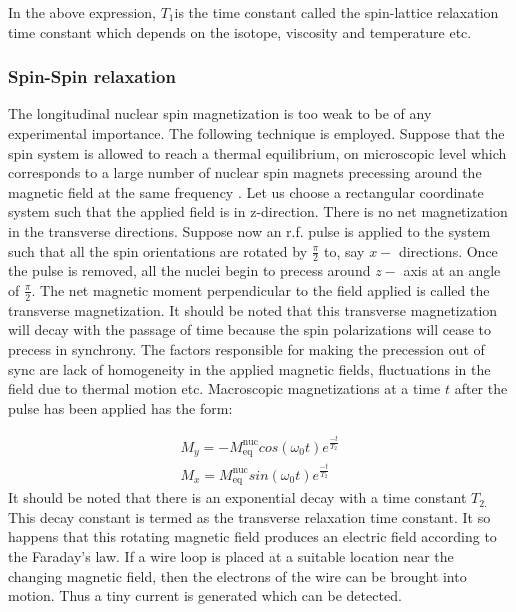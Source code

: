 		In the above expression, $T_{1}$is the time constant called the spin-lattice
		relaxation time constant which depends on the isotope, viscosity and
		temperature etc.


		\subsubsection{Spin-Spin relaxation}

		The longitudinal nuclear spin magnetization is too weak to be of any
		experimental importance. The following technique is employed. Suppose
		that the spin system is allowed to reach a thermal equilibrium, on
		microscopic level which corresponds to a large number of nuclear spin
		magnets precessing around the magnetic field at the same frequency
		. Let us choose a rectangular coordinate system such that the applied
		field is in z-direction. There is no net magnetization in the transverse
		directions. Suppose now an r.f. pulse is applied to the system such
		that all the spin orientations are rotated by $\frac{\pi}{2}$ to,
		say $x-$ directions. Once the pulse is removed, all the nuclei begin
		to precess around $z-$ axis at an angle of $\frac{\pi}{2}$. The
		net magnetic moment perpendicular to the field applied is called the
		transverse magnetization. It should be noted that this transverse
		magnetization will decay with the passage of time because the spin
		polarizations will cease to precess in synchrony. The factors responsible
		for making the precession out of sync are lack of homogeneity in
		the applied magnetic fields, fluctuations in the field due to thermal
		motion etc. Macroscopic magnetizations at a time $t$ after the pulse
		has been applied has the form:

		\begin{equation}
		\begin{array}{c}
		M_{y}=-M_\text{eq}^\text{nuc}cos(\omega_{0}t)e^{\frac{-t}{T_{2}}}\\
		M_{x}=M_\text{eq}^\text{nuc}sin(\omega_{0}t)e^{\frac{-t}{T_{2}}}
		\end{array}
		\end{equation}
		It should be noted that there is an exponential decay with a time
		constant $T_{2.}$ This decay constant is termed as the transverse
		relaxation time constant. It so happens that this rotating magnetic
		field produces an electric field according to the Faraday's law. If
		a wire loop is placed at a suitable location near the changing magnetic
		field, then the electrons of the wire can be brought into motion.
		Thus a tiny current is generated which can be detected. 


